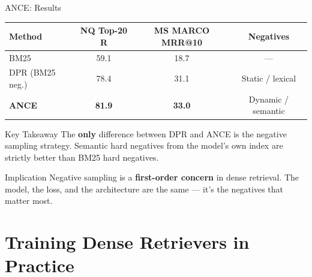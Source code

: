 \documentclass[aspectratio=169]{beamer}
\newif\ifanimated
\newcommand{\cpause}{\ifanimated\pause\fi}
\begin{document}
\begin{frame}{ANCE: Results}
\begin{center}
\begin{tabular}{lccc}
\toprule
\textbf{Method} & \textbf{NQ Top-20 R} & \textbf{MS MARCO MRR@10} & \textbf{Negatives} \\
\midrule
BM25 & 59.1 & 18.7 & --- \\
DPR (BM25 neg.) & 78.4 & 31.1 & Static / lexical \\
\textbf{ANCE} & \textbf{81.9} & \textbf{33.0} & Dynamic / semantic \\
\bottomrule
\end{tabular}
\end{center}

\cpause
\vspace{1em}

\begin{exampleblock}{Key Takeaway}
The \textbf{only} difference between DPR and ANCE is the negative sampling strategy. Semantic hard negatives from the model's own index are strictly better than BM25 hard negatives.
\end{exampleblock}

\begin{alertblock}{Implication}
Negative sampling is a \textbf{first-order concern} in dense retrieval. The model, the loss, and the architecture are the same --- it's the negatives that matter most.
\end{alertblock}
\end{frame}

\section{Training Dense Retrievers in Practice}

\begin{frame}[plain]
\sectionpage
\end{frame}
\end{document}
